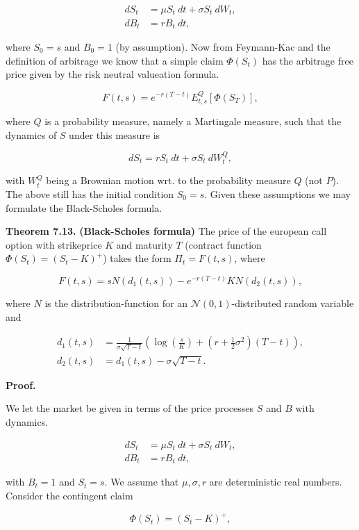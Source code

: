 \documentclass[
]{article}
\begin{document}
\begin{align*}
dS_t&=\mu S_t\ dt+\sigma S_t\ dW_t,\\
dB_t&=r B_t\ dt,
\end{align*}

where \(S_0=s\) and \(B_0=1\) (by assumption). Now from Feymann-Kac and
the definition of arbitrage we know that a simple claim \(\Phi(S_t)\)
has the arbitrage free price given by the risk neutral valueation
formula.

\[
F(t,s)=e^{-r(T-t)}E^Q_{t,s}[\Phi(S_T)],
\]

where \(Q\) is a probability measure, namely a Martingale measure, such
that the dynamics of \(S\) under this measure is

\[
dS_t=r S_t\ dt+\sigma S_t\ dW^Q_t,
\]

with \(W_t^Q\) being a Brownian motion wrt. to the probability measure
\(Q\) (not \(P\)). The above still has the initial condition \(S_0=s\).
Given these assumptions we may formulate the Black-Scholes formula.

\textbf{Theorem 7.13.} \textbf{(Black-Scholes formula)} The price of the
european call option with strikeprice \(K\) and maturity \(T\) (contract
function \(\Phi(S_t)=\left( S_t - K\right)^+\)) takes the form
\(\Pi_t=F(t,s)\), where

\[
F(t,s)=s N(d_1(t,s))-e^{-r(T-t)}KN(d_2(t,s)),\tag{7.52}
\]

where \(N\) is the distribution-function for an
\(\mathcal{N}(0,1)\)-distributed random variable and

\begin{align*}
d_1(t,s)&=\frac{1}{\sigma \sqrt{T-t}}\left(\log\left(\frac{s}{K}\right)+\left(r+\frac{1}{2}\sigma^2\right)(T-t)\right),\tag{7.53}\\
d_2(t,s)&=d_1(t,s)-\sigma\sqrt{T-t}.\tag{7.54}
\end{align*}

\textbf{Proof.}

We let the market be given in terms of the price processes \(S\) and
\(B\) with dynamics.

\begin{align*}
dS_t&=\mu S_t\ dt+\sigma S_t\ dW_t,\\
dB_t&=r B_t\ dt,
\end{align*}

with \(B_t=1\) and \(S_t=s\). We assume that \(\mu,\sigma, r\) are
deterministic real numbers. Consider the contingent claim

\[
\Phi(S_t)=\left( S_t - K\right)^+,
\]
\end{document}
